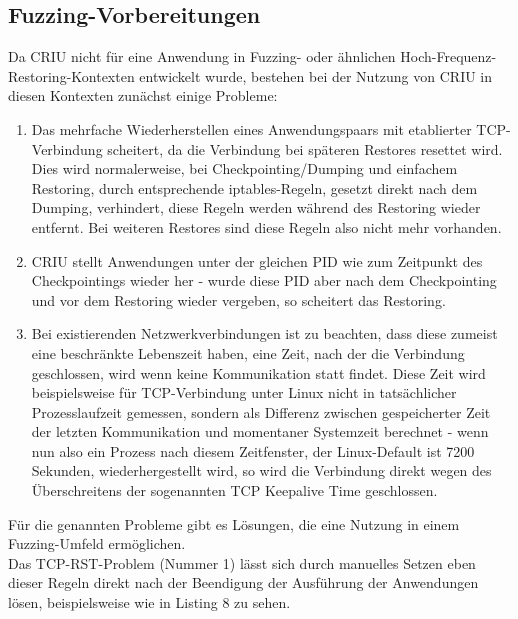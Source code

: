 \documentclass[a4paper]{article}
\begin{document}
\subsection{Fuzzing-Vorbereitungen}
Da CRIU nicht für eine Anwendung in Fuzzing- oder ähnlichen Hoch-Frequenz-Restoring-Kontexten entwickelt wurde, bestehen bei der Nutzung von CRIU in diesen Kontexten zunächst einige Probleme:
\begin{enumerate}
    \item Das mehrfache Wiederherstellen eines Anwendungspaars mit etablierter TCP-Verbindung scheitert, da die Verbindung bei späteren Restores resettet wird. Dies wird normalerweise, bei Checkpointing/Dumping und einfachem Restoring, durch entsprechende iptables-Regeln, gesetzt direkt nach dem Dumping, verhindert, diese Regeln werden während des Restoring wieder entfernt. Bei weiteren Restores sind diese Regeln also nicht mehr vorhanden.
    \item CRIU stellt Anwendungen unter der gleichen PID wie zum Zeitpunkt des Checkpointings wieder her - wurde diese PID aber nach dem Checkpointing und vor dem Restoring wieder vergeben, so scheitert das Restoring.
    \item Bei existierenden Netzwerkverbindungen ist zu beachten, dass diese zumeist eine beschränkte Lebenszeit haben, eine Zeit, nach der die Verbindung geschlossen, wird wenn keine Kommunikation statt findet. Diese Zeit wird beispielsweise für TCP-Verbindung unter Linux nicht in tatsächlicher Prozesslaufzeit gemessen, sondern als Differenz zwischen gespeicherter Zeit der letzten Kommunikation und momentaner Systemzeit berechnet - wenn nun also ein Prozess nach diesem Zeitfenster, der Linux-Default ist 7200 Sekunden, wiederhergestellt wird, so wird die Verbindung direkt wegen des Überschreitens der sogenannten TCP Keepalive Time geschlossen.
\end{enumerate}
Für die genannten Probleme gibt es Lösungen, die eine Nutzung in einem Fuzzing-Umfeld ermöglichen.\\
Das TCP-RST-Problem (Nummer 1) lässt sich durch manuelles Setzen eben dieser Regeln direkt nach der Beendigung der Ausführung der Anwendungen lösen, beispielsweise wie in Listing 8 zu sehen.
\end{document}
